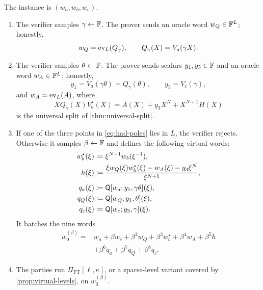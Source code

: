 \begin{definition}
\label{def:hadamard-protocol}
The instance is $(w_a,w_b,w_c)$.
\begin{enumerate}[label=\textnormal{\arabic*.},leftmargin=*]
  \item The verifier samples $\gamma\leftarrow\mathbb{F}$.  The prover sends an oracle word $w_Q\in\mathbb{F}^L$; honestly,
  \[
    w_Q=\operatorname{ev}_L(Q_\gamma),
    \qquad
    Q_\gamma(X)=V_a(\gamma X).
  \]
  \item The verifier samples $\theta\leftarrow\mathbb{F}$.  The prover sends scalars $y_1,y_3\in\mathbb{F}$ and an oracle word $w_A\in\mathbb{F}^L$; honestly,
  \begin{equation}
    y_1=V_a(\gamma\theta)=Q_\gamma(\theta),
    \qquad
    y_3=V_c(\gamma),
    \label{eq:had-honest-values}
  \end{equation}
  and $w_A=\operatorname{ev}_L(A)$, where
  \begin{equation}
    XQ_\gamma(X)V_b^{\star}(X)
    =A(X)+y_3X^N+X^{N+1}H(X)
    \label{eq:had-opening-identity}
  \end{equation}
  is the universal split of \cref{thm:universal-split}.
  \item If one of the three points in \eqref{eq:had-poles} lies in $L$, the verifier rejects.  Otherwise it samples $\beta\leftarrow\mathbb{F}$ and defines the following virtual words:
  \begin{align}
    w_b^{\star}(\xi)
      &\coloneqq \xi^{N-1}w_b(\xi^{-1}),
      \label{eq:had-wrev}\\
    h(\xi)
      &\coloneqq
      \frac{\xi w_Q(\xi)w_b^{\star}(\xi)-w_A(\xi)-y_3\xi^N}{\xi^{N+1}},
      \label{eq:had-high}\\
    q_a(\xi)
      &\coloneqq \mathsf Q[w_a;y_1,\gamma\theta](\xi),
      \label{eq:had-qa}\\
    q_Q(\xi)
      &\coloneqq \mathsf Q[w_Q;y_1,\theta](\xi),
      \label{eq:had-qQ}\\
    q_c(\xi)
      &\coloneqq \mathsf Q[w_c;y_3,\gamma](\xi).
      \label{eq:had-qc}
  \end{align}
  It batches the nine words
  \begin{equation}
  \begin{split}
    w_0^{(\beta)}={}&
      w_a+\beta w_c+\beta^2w_Q+\beta^3w_b^{\star}
      +\beta^4w_A+\beta^5h\\
      &+\beta^6q_a+\beta^7q_Q+\beta^8q_c.
  \end{split}
  \label{eq:had-batch}
  \end{equation}
  \item The parties run $\Pi_{\mathrm{FT}}[\ell,\kappa]$, or a sparse-level variant covered by \cref{prop:virtual-levels}, on $w_0^{(\beta)}$.
\end{enumerate}
\end{definition}

